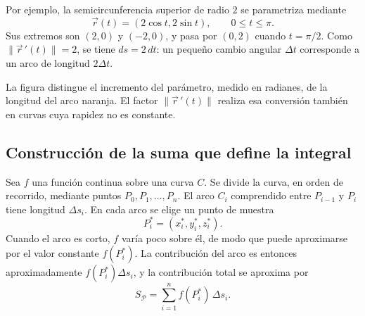 Por ejemplo, la semicircunferencia superior de radio $2$ se parametriza mediante
\[
\vec r(t)=(2\cos t,2\sin t),\qquad 0\leq t\leq\pi.
\]
Sus extremos son $(2,0)$ y $(-2,0)$, y pasa por $(0,2)$ cuando $t=\pi/2$. Como $\|\vec r\,'(t)\|=2$, se tiene $ds=2\,dt$: un pequeño cambio angular $\Delta t$ corresponde a un arco de longitud $2\Delta t$.

\begingroup
\shorthandoff{>}
\begin{center}
\end{center}
\endgroup

La figura distingue el incremento del parámetro, medido en radianes, de la longitud del arco naranja. El factor $\|\vec r\,'(t)\|$ realiza esa conversión también en curvas cuya rapidez no es constante.

\subsection{Construcción de la suma que define la integral}

Sea $f$ una función continua sobre una curva $C$. Se divide la curva, en orden de recorrido, mediante puntos $P_0,P_1,\ldots,P_n$. El arco $C_i$ comprendido entre $P_{i-1}$ y $P_i$ tiene longitud $\Delta s_i$. En cada arco se elige un punto de muestra
\[
P_i^*=(x_i^*,y_i^*,z_i^*).
\]
Cuando el arco es corto, $f$ varía poco sobre él, de modo que puede aproximarse por el valor constante $f(P_i^*)$. La contribución del arco es entonces aproximadamente $f(P_i^*)\Delta s_i$, y la contribución total se aproxima por
\[
S_{\mathcal P}=\sum_{i=1}^n f(P_i^*)\,\Delta s_i.
\]

